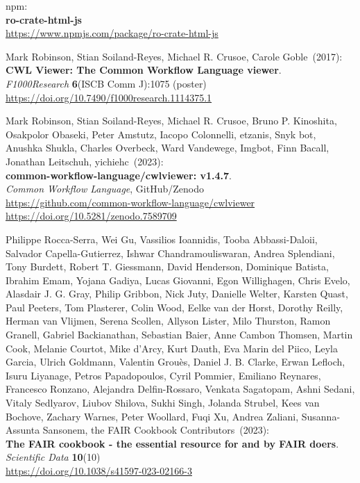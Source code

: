\begin{thebibliography}{9}
npm:\\
\textbf{ro-crate-html-js}\\
\url{https://www.npmjs.com/package/ro-crate-html-js}

Mark Robinson, Stian Soiland-Reyes, Michael R. Crusoe, Carole Goble~(2017): \\
\textbf{CWL Viewer: The Common Workflow Language viewer}.\\
\emph{F1000Research} \textbf{6}(ISCB Comm J):1075 (poster)\\
\url{https://doi.org/10.7490/f1000research.1114375.1} 

Mark Robinson, Stian Soiland-Reyes, Michael R. Crusoe, Bruno P. Kinoshita, Osakpolor Obaseki, Peter Amstutz, Iacopo Colonnelli, etzanis, Snyk bot, Anushka Shukla, Charles Overbeck, Ward Vandewege, Imgbot, Finn Bacall, Jonathan Leitschuh, yichiehc~(2023): \\
\textbf{common-workflow-language/cwlviewer: v1.4.7}.\\
\emph{Common Workflow Language}, GitHub/Zenodo\\
\url{https://github.com/common-workflow-language/cwlviewer}\\
\url{https://doi.org/10.5281/zenodo.7589709}

Philippe Rocca-Serra, Wei Gu, Vassilios Ioannidis, Tooba Abbassi-Daloii, Salvador Capella-Gutierrez, Ishwar Chandramouliswaran, Andrea Splendiani, Tony Burdett, Robert T. Giessmann, David Henderson, Dominique Batista, Ibrahim Emam, Yojana Gadiya, Lucas Giovanni, Egon Willighagen, Chris Evelo, Alasdair J. G. Gray, Philip Gribbon, Nick Juty, Danielle Welter, Karsten Quast, Paul Peeters, Tom Plasterer, Colin Wood, Eelke van der Horst, Dorothy Reilly, Herman van Vlijmen, Serena Scollen, Allyson Lister, Milo Thurston, Ramon Granell, Gabriel Backianathan, Sebastian Baier, Anne Cambon Thomsen, Martin Cook, Melanie Courtot, Mike d'Arcy, Kurt Dauth, Eva Marin del Piico, Leyla Garcia, Ulrich Goldmann, Valentin Grouès, Daniel J. B. Clarke, Erwan Lefloch, Isuru Liyanage, Petros Papadopoulos, Cyril Pommier, Emiliano Reynares, Francesco Ronzano, Alejandra Delfin-Rossaro, Venkata Sagatopam, Ashni Sedani, Vitaly Sedlyarov, Liubov Shilova, Sukhi Singh, Jolanda Strubel, Kees van Bochove, Zachary Warnes, Peter Woollard, Fuqi Xu, Andrea Zaliani, Susanna-Assunta Sansonem, the FAIR Cookbook Contributors~(2023): \\
\textbf{The {FAIR} cookbook - the essential resource for and by {FAIR} doers}.\\
\emph{Scientific Data} \textbf{10}(10)\\
\url{https://doi.org/10.1038/s41597-023-02166-3}


\end{thebibliography}
